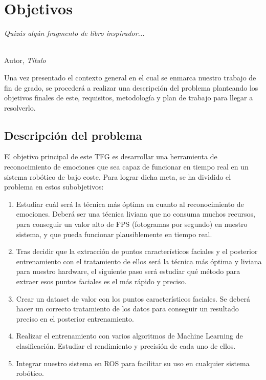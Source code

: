 \chapter{Objetivos}
\label{cap:capitulo2}

\begin{flushright}
\begin{minipage}[]{10cm}
\emph{Quizás algún fragmento de libro inspirador...}\\
\end{minipage}\\

Autor, \textit{Título}\\
\end{flushright}

\vspace{1cm}

Una vez presentado el contexto general en el cual se enmarca nuestro trabajo de fin de grado, se procederá a realizar una descripción del problema planteando los objetivos finales de este, requisitos, metodología y plan de trabajo para llegar a resolverlo.

\section{Descripción del problema}
\label{sec:descripcion}

El objetivo principal de este TFG es desarrollar una herramienta de reconocimiento de emociones que sea capaz de funcionar en tiempo real en un sistema robótico de bajo coste. Para lograr dicha meta, se ha dividido el problema en estos subobjetivos:
\begin{enumerate}
    \item Estudiar cuál será la técnica más óptima en cuanto al reconocimiento de emociones. Deberá ser una técnica liviana que no consuma muchos recursos, para conseguir un valor alto de FPS (fotogramas por segundo) en nuestro sistema, y que pueda funcionar plausiblemente en tiempo real.
    
    \item Tras decidir que la extracción de puntos característicos faciales y el posterior entrenamiento con el tratamiento de ellos será la técnica más óptima y liviana para nuestro hardware, el siguiente paso será estudiar qué método para extraer esos puntos faciales es el más rápido y preciso.
    
    \item Crear un dataset de valor con los puntos característicos faciales. Se deberá hacer un correcto tratamiento de los datos para conseguir un resultado preciso en el posterior entrenamiento.
    
    \item Realizar el entrenamiento con varios algoritmos de Machine Learning de clasificación. Estudiar el rendimiento y precisión de cada uno de ellos.
    
    \item Integrar nuestro sistema en ROS para facilitar su uso en cualquier sistema robótico.
\end{enumerate}

